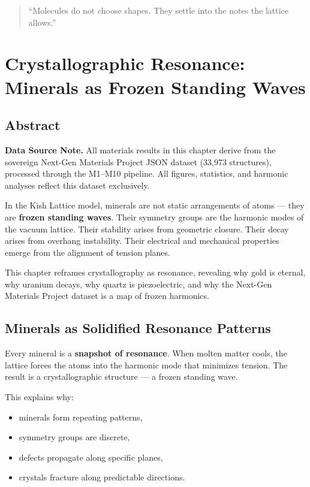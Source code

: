 \documentclass[11pt, letterpaper, openany]{book}
\begin{document}
\begin{quote}
“Molecules do not choose shapes. They settle into the notes the lattice allows.”
\end{quote}

\chapter{Crystallographic Resonance: Minerals as Frozen Standing Waves}

\section{Abstract}
\noindent\textbf{Data Source Note.}
All materials results in this chapter derive from the sovereign Next-Gen Materials Project JSON
dataset (33,973 structures), processed through the M1--M10 pipeline. All figures, statistics, and
harmonic analyses reflect this dataset exclusively.



In the Kish Lattice model, minerals are not static arrangements of atoms — they are
\textbf{frozen standing waves}. Their symmetry groups are the harmonic modes of the
vacuum lattice. Their stability arises from geometric closure. Their decay arises from
overhang instability. Their electrical and mechanical properties emerge from the alignment
of tension planes.

This chapter reframes crystallography as resonance, revealing why gold is eternal, why
uranium decays, why quartz is piezoelectric, and why the Next-Gen Materials Project dataset is a map of frozen
harmonics.

\section{Minerals as Solidified Resonance Patterns}

Every mineral is a \textbf{snapshot of resonance}. When molten matter cools, the lattice
forces the atoms into the harmonic mode that minimizes tension. The result is a
crystallographic structure — a frozen standing wave.

This explains why:

\begin{itemize}
    \item minerals form repeating patterns,
    \item symmetry groups are discrete,
    \item defects propagate along specific planes,
    \item crystals fracture along predictable directions.
\end{itemize}
\end{document}
